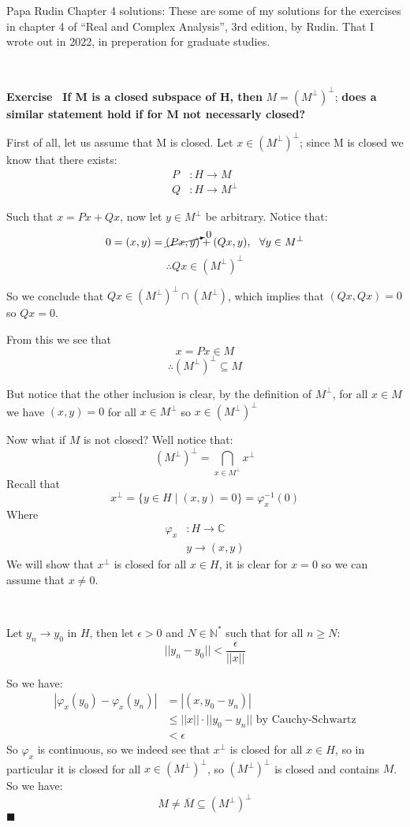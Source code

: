 \documentclass{article}
\title{}
\author{}
\date{}
\newcommand{\C}{\mathbb{C}}
\newcommand{\N}{\mathbb{N}}
\theoremstyle{definition}
\theoremstyle{remark}
\theoremstyle{definition}
\newcounter{exercise}[subsection]
\newenvironment{exercise}{\setcounter{equation}{0}\refstepcounter{exercise}\textbf{Exercise~\theexercise}}{}
\begin{document}
	Papa Rudin Chapter 4 solutions:
    These are some of my solutions for the exercises in chapter 4 of ``Real and Complex Analysis'', 3rd edition, by Rudin.
That I wrote out in 2022, in preperation for graduate studies. 

    \


    \begin{exercise}
       \textbf{If M is a closed subspace of H, then} $M={(M^\perp)}^\perp$; \textbf{ does a similar statement hold if for M not necessarly closed?}

       First of all, let us assume that M is closed. Let $x\in {(M^\perp)}^\perp$; since M is closed we know that there exists:
       \begin{align}
              P &\colon H\rightarrow M\\
              Q &\colon H\rightarrow M^\perp
    \end{align}

Such that $x = Px + Qx$, now let $y\in M^\perp$ be arbitrary. Notice that:
\[0 = (x,y) = \cancelto{0}{(Px,y)} + (Qx,y), \  \ \forall y\in M^\perp\]
\[\therefore Qx\in {(M^\perp)}^\perp\]

So we conclude that $Qx\in {(M^\perp)}^\perp\cap (M^\perp)$, which implies that $(Qx,Qx) = 0$ so $Qx=0$.

From this we see that \[x=Px\in M\]
\[\therefore {(M^\perp)}^\perp\subseteq M\]

But notice that the other inclusion is clear, by the definition of $M^\perp$, for all $x\in M$ we have $(x,y) = 0$ for all $x\in M^\perp$ so $x\in {(M^\perp)}^\perp$
 
Now what if $M$ is not closed? Well notice that:\[{(M^\perp)}^\perp = \bigcap_{x\in M^\perp}x^\perp\]
Recall that \[x^\perp = \{y\in H \mid (x,y) = 0\} = \varphi_x^{-1}(0)\]
Where \begin{align}
    \varphi_x&\colon H\rightarrow \C\\
    &y\rightarrow (x,y)
\end{align}
We will show that $x^\perp$ is closed for all $x\in H$, it is clear for $x=0$ so we can assume that $x\neq 0$. 

\

Let $y_n\rightarrow y_0$ in $H$, then let $\epsilon>0$ and $N\in\N^\ast$ such that 
for all $n\geq N$: \[||y_n-y_0||<\frac{\epsilon}{||x||}\]

So we have:\begin{align*}
    |\varphi_x(y_0)-\varphi_x(y_n)| &= |(x,y_0-y_n)|\\
    &\leq ||x||\cdot||y_0-y_n|| \text{ by Cauchy-Schwartz}\\
    &<\epsilon
\end{align*}
So $\varphi_x$ is continuous, so we indeed see that $x^\perp$ is closed for all $x\in H$, so in particular it is closed
for all $x\in {(M^\perp)}^\perp$, so ${(M^\perp)}^\perp$ is closed and contains $M$. So we have:\begin{equation}
    M\neq \overline{M}\subseteq {(M^\perp)}^\perp
\end{equation}
$\blacksquare$
\end{exercise}
\end{document}
